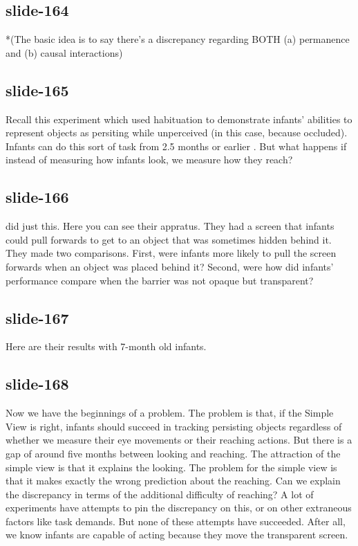 \documentclass[12pt,\papersize]{extarticle}
\begin{document}
 
\subsection{slide-164}
*(The basic idea is to say there's a discrepancy regarding BOTH (a) permanence and (b) causal interactions)
 
 
\subsection{slide-165}
Recall this experiment which used habituation to demonstrate infants' abilities to represent objects as persiting while unperceived (in this case, because occluded). Infants can do this sort of task from 2.5 months or earlier \citep{Aguiar:1999jq}.
But what happens if instead of measuring how infants look, we measure how they reach?
 
 
\subsection{slide-166}
\citet{Shinskey:2001fk} did just this. Here you can see their appratus. They had a screen that infants could pull forwards to get to an object that was sometimes hidden behind it. They made two comparisons. First, were infants more likely to pull the screen forwards when an object was placed behind it? Second, were how did infants' performance compare when the barrier was not opaque but transparent?
 
 
\subsection{slide-167}
Here are their results with 7-month old infants.
 
 
\subsection{slide-168}
Now we have the beginnings of a problem. The problem is that, if the Simple View is right, infants should succeed in tracking persisting objects regardless of whether we measure their eye movements or their reaching actions. But there is a gap of around five months between looking and reaching.
The attraction of the simple view is that it explains the looking. The problem for the simple view is that it makes exactly the wrong prediction about the reaching.
Can we explain the discrepancy in terms of the additional difficulty of reaching? A lot of experiments have attempts to pin the discrepancy on this, or on other extraneous factors like task demands. But none of these attempts have succeeded. After all, we know infants are capable of acting because they move the transparent screen.
 
\end{document}
